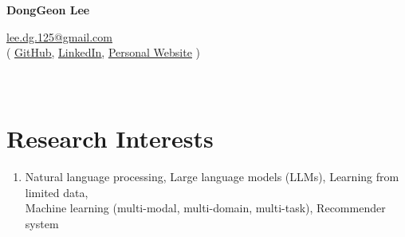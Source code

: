 \documentclass[letterpaper,11pt]{article}
\begin{document}
    \pagestyle{fancy}
    \thispagestyle{fancy}
    
    \begin{center}
        {\LARGE{\bf{DongGeon Lee}}\\}
    \end{center}
    
    \vspace{-14pt}
    
    \begin{center} 
        {\href{mailto:lee.dg.125@gmail.com}{lee.dg.125@gmail.com} \\}
        {
            ( \underline{\href{https://github.com/oneonlee}{GitHub}}, 
            \underline{\href{https://www.linkedin.com/in/dong-geon-lee/}{LinkedIn}},
            \underline{\href{https://donggeon.github.io/}{Personal Website}} )
        }
    \end{center}

    \section{\\Research Interests}
    \begin{enumerate}[noitemsep, leftmargin=*,label={}]
    \item{Natural language processing, Large language models (LLMs), Learning from limited data,\\Machine learning (multi-modal, multi-domain, multi-task), Recommender system}
    \end{enumerate}
    
\end{document}
